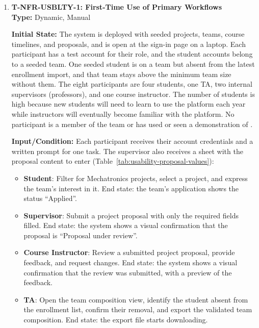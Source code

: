 \documentclass[12pt, titlepage]{article}
\newcommand{\usabilityParticipants}{eight}
\begin{document}
\begin{enumerate}

\item \label{T-NFR-USBLTY-1}\textbf{T-NFR-USBLTY-1: First-Time Use of Primary Workflows}\\

\textbf{Type:} Dynamic, Manual
					
\textbf{Initial State:} The system is deployed with seeded projects, teams,
course timelines, and proposals, and is open at the sign-in page on a laptop.
Each participant has a test account
for their role, and the student accounts belong to a seeded team. One seeded
student is on a team but absent from the latest enrollment import, and that
team stays above the minimum team size without them. The
\usabilityParticipants{} participants are four students, one TA, two internal supervisors (professors),
and one course instructor. The number of students is high because new students will
need to learn to use the platform each year while instructors will eventually
become familiar with the platform. No participant is a member of the \projname{} team or 
has used or seen a demonstration of \projname{}.

\textbf{Input/Condition:} Each participant receives their account credentials
and a written prompt for one task. The supervisor also receives a sheet with
the proposal content to enter (Table~\ref{tab:usability-proposal-values}):
\begin{itemize}
  \item \textbf{Student}: Filter for Mechatronics projects, select a
  project, and express the team's interest in it. End state: the team's
  application shows the status ``Applied''.
  \item \textbf{Supervisor}: Submit a project proposal with only the required
  fields filled. End state: the system shows a visual confirmation
  that the proposal is ``Proposal under review''.
  \item \textbf{Course Instructor}: Review a submitted project proposal,
  provide feedback, and request changes. End state: the system shows a visual
  confirmation that the review was submitted, with a preview of the feedback.
  \item \textbf{TA}: Open the team composition view, identify the student
  absent from the enrollment list, confirm their removal, and export the
  validated team composition. End state: the export file starts
  downloading.
\end{itemize}


\end{enumerate}
\end{document}
